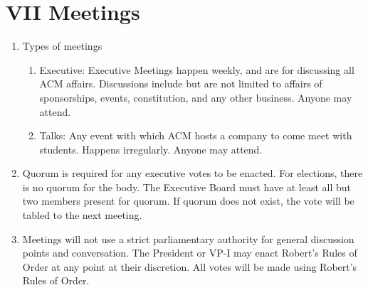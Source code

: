 
\section{VII \textendash{} Meetings}
\begin{enumerate}
  \item	Types of meetings
    \begin{enumerate}
      \item Executive: Executive Meetings happen weekly, and are for discussing
      all ACM affairs. Discussions include but are not limited to affairs of
      sponsorships, events, constitution, and any other business. Anyone may attend.
      \item	Talks: Any event with which ACM hosts a company to come meet with
      students. Happens irregularly. Anyone may attend.
    \end{enumerate}
  \item Quorum is required for any executive votes to be enacted. For elections,
    there is no quorum for the body. The Executive Board must have at least all
    but two members present for quorum. If quorum does not exist, the vote will
    be tabled to the next meeting.
  \item Meetings will not use a strict parliamentary authority for general
    discussion points and conversation. The President or VP-I may enact Robert's
    Rules of Order at any point at their discretion.  All votes will be made
    using Robert’s Rules of Order.
\end{enumerate}

